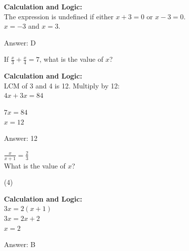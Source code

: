 \documentclass[11pt,paper=a4,answers]{exam}
\begin{document}
\begin{questions}
\begin{solution}
\textbf{Calculation and Logic:} \\
The expression is undefined if either $x+3=0$ or $x-3=0$. \\
$x = -3$ and $x = 3$.

\vspace{25pt}

Answer: \colorbox{yellow!100}{D}
\end{solution}

\vspace{40pt}

\question
If $\frac{x}{3} + \frac{x}{4} = 7$, what is the value of $x$?

\begin{solution}
\textbf{Calculation and Logic:} \\
LCM of 3 and 4 is 12. Multiply by 12: \\
$4x + 3x = 84$

\vspace{10pt}

$7x = 84$ \\
$x = 12$

\vspace{25pt}

Answer: \colorbox{yellow!100}{12}
\end{solution}

\vspace{40pt}

\question
$\frac{x}{x+1} = \frac{2}{3}$ \\
What is the value of $x$?
\begin{tasks}(4)
\end{tasks}

\begin{solution}
\textbf{Calculation and Logic:} \\
$3x = 2(x + 1)$ \\
$3x = 2x + 2$ \\
$x = 2$

\vspace{25pt}

Answer: \colorbox{yellow!100}{B}
\end{solution}

\vspace{40pt}


\end{questions}
\end{document}

